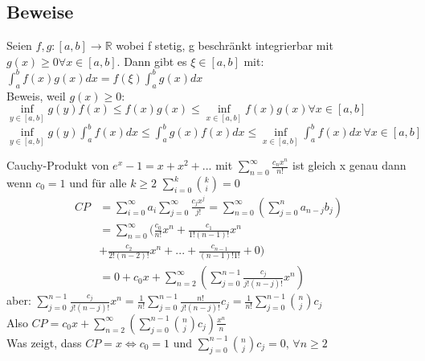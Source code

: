 \documentclass[a4paper,10pt]{article}
\def\sumn{\sum\limits_{n=0}^{\infty}}
\def\R{\mathbb{R}}
\begin{document}
\subsection{Beweise}
\begin{subbox}{}
  Seien $f,g : [a,b] \to \R$ wobei f stetig, g beschränkt integrierbar mit $g(x) \geq 0 \forall x\in[a,b]$. Dann gibt es $\xi \in [a,b]$ mit:\\
  $\int_a^b f(x)g(x)dx = f(\xi)\int_a^b g(x)dx$\\
  Beweis, weil $g(x) \geq 0$:\\
  $\underset{y\in[a,b]}{\inf}g(y)f(x) \leq f(x)g(x) \leq \underset{x\in[a,b]}{\inf} f(x)g(x) \forall x \in [a,b]$\\
  $\underset{y\in[a,b]}{\inf}g(y)\int_a^b f(x)dx \leq \int_a^b g(x)f(x)dx \leq \underset{x\in[a,b]}{\inf} \int_a^b f(x)dx \, \forall x \in [a,b]$
\end{subbox}

\begin{subbox}{}
  Cauchy-Produkt von $e^x - 1 = x + x^2 + ...$ mit $\sumn \frac{c_n x^n}{n!}$ ist gleich x genau dann wenn $c_0=1$ und für alle $k\geq 2$ $\sum\limits_{i=0}^{k}\binom{k}{i} = 0$\\
  \begin{align*}
    CP &= \sum\limits_{i=0}^{\infty}a_i \sum\limits_{j=0}^{\infty}\frac{c_j x^j}{j!} = \sumn(\sum\limits_{j=0}^{n}a_{n-j}b_j)\\
    &= \sumn(\frac{c_0}{n!}x^n + \frac{c_1}{1!(n-1)!}x^n\\
    &+ \frac{c_2}{2!(n-2)!}x^n + ... + \frac{c_{n-1}}{(n-1)!1!} + 0)\\
    &= 0 + c_0x + \sum\limits_{n=2}^{\infty}(\sum\limits_{j=0}^{n-1}\frac{c_j}{j!(n-j)!}x^n)
  \end{align*}
  aber: 
  $\sum\limits_{j=0}^{n-1}\frac{c_j}{j!(n-j)!}x^n = \frac{1}{n!}\sum\limits_{j=0}^{n-1}\frac{n!}{j!(n-j)!}c_j = \frac{1}{n!}\sum\limits_{j=0}^{n-1}\binom{n}{j}c_j$\\
  Also $CP = c_0x + \sum\limits_{n=2}^{\infty}(\sum\limits_{j=0}^{n-1}\binom{n}{j}c_j)\frac{x^n}{n}$\\
  Was zeigt, dass $CP = x \Leftrightarrow c_0 = 1$ und $\sum\limits_{j=0}^{n-1}\binom{n}{j}c_j = 0, \, \forall n\geq 2$
\end{subbox}
\end{document}

